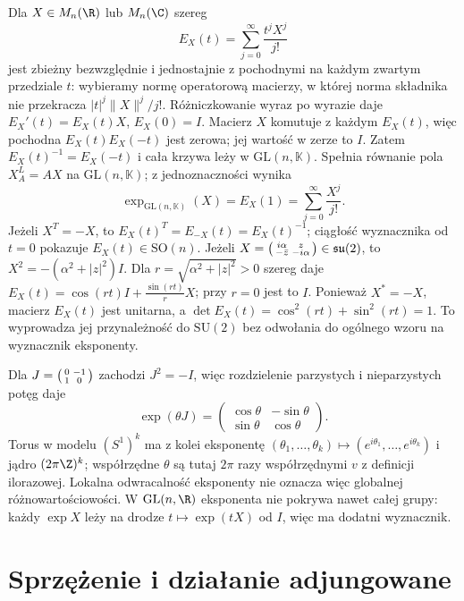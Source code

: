 \begin{przyklad}
\label{prz:matrix-exp-lie}
Dla $X\in M_n(\R)$ lub $M_n(\C)$ szereg
\[
 E_X(t)=\sum_{j=0}^{\infty}\frac{t^jX^j}{j!}
\]
jest zbieżny bezwzględnie i jednostajnie z pochodnymi
na każdym zwartym przedziale $t$: wybieramy normę
operatorową macierzy, w której norma składnika nie
przekracza $|t|^j\|X\|^j/j!$. Różniczkowanie wyraz po
wyrazie daje $E_X'(t)=E_X(t)X$, $E_X(0)=I$.
Macierz $X$ komutuje z każdym $E_X(t)$, więc
pochodna $E_X(t)E_X(-t)$ jest zerowa; jej wartość
w zerze to $I$. Zatem $E_X(t)^{-1}=E_X(-t)$
i cała krzywa leży w $\mathrm{GL}(n,\mathbb K)$.
Spełnia równanie pola $X^L_A=AX$ na
$\mathrm{GL}(n,\mathbb K)$; z jednoznaczności wynika
\[
 \exp_{\mathrm{GL}(n,\mathbb K)}(X)
 =E_X(1)=\sum_{j=0}^{\infty}\frac{X^j}{j!}.
\]
Jeżeli $X^T=-X$, to
$E_X(t)^T=E_{-X}(t)=E_X(t)^{-1}$;
ciągłość wyznacznika od $t=0$ pokazuje
$E_X(t)\in\mathrm{SO}(n)$.
Jeżeli
$X=\begin{psmallmatrix}i\alpha&z\\-\bar z&-i\alpha\end{psmallmatrix}
\in\mathfrak{su}(2)$, to
$X^2=-(\alpha^2+|z|^2)I$. Dla
$r=\sqrt{\alpha^2+|z|^2}>0$ szereg daje
$E_X(t)=\cos(rt)I+\frac{\sin(rt)}{r}X$;
przy $r=0$ jest to $I$. Ponieważ $X^*=-X$,
macierz $E_X(t)$ jest unitarna, a
$\det E_X(t)=\cos^2(rt)+\sin^2(rt)=1$.
To wyprowadza jej przynależność do $\mathrm{SU}(2)$
bez odwołania do ogólnego wzoru na wyznacznik
eksponenty.

Dla $J=\begin{psmallmatrix}0&-1\\1&0\end{psmallmatrix}$
zachodzi $J^2=-I$, więc rozdzielenie parzystych i
nieparzystych potęg daje
\[
 \exp(\theta J)=
 \begin{pmatrix}\cos\theta&-\sin\theta\\
 \sin\theta&\cos\theta\end{pmatrix}.
\]
Torus w modelu $(S^1)^k$ ma z kolei eksponentę
$(\theta_1,\ldots,\theta_k)\mapsto
(e^{i\theta_1},\ldots,e^{i\theta_k})$ i jądro
$(2\pi\Z)^k$; współrzędne $\theta$ są tutaj
$2\pi$ razy współrzędnymi $v$ z definicji ilorazowej.
Lokalna odwracalność eksponenty nie oznacza więc
globalnej różnowartościowości. W $\mathrm{GL}(n,\R)$
eksponenta nie pokrywa nawet całej grupy: każdy
$\exp X$ leży na drodze $t\mapsto\exp(tX)$ od $I$,
więc ma dodatni wyznacznik.
\end{przyklad}

\section{Sprzężenie i działanie adjungowane}
\label{sec:lie-adjoint}

